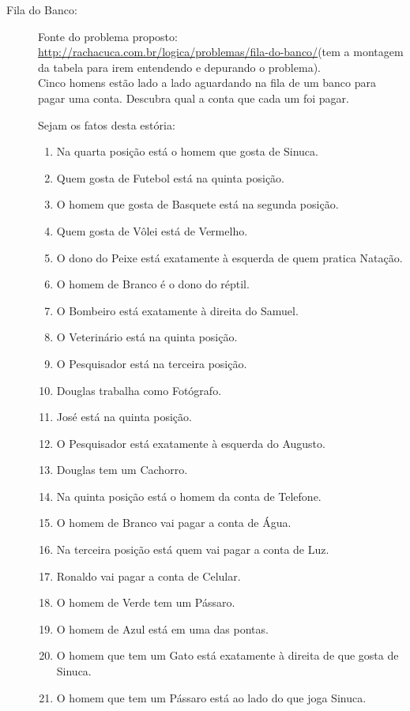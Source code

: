 \documentclass[a4paper,12pt]{article}
\begin{document}
\begin{description}

\newpage
\item [Fila do Banco:] Fonte do problema proposto:   \url{http://rachacuca.com.br/logica/problemas/fila-do-banco/}(tem a montagem da tabela para irem entendendo e depurando o problema).\\
Cinco homens estão lado a lado aguardando na fila de um banco para pagar uma conta. Descubra qual a conta que cada um foi pagar.


Sejam os fatos desta estória:
\begin{enumerate}
   
  \item   Na quarta posição está o homem que gosta de Sinuca.
  \item Quem gosta de Futebol está na quinta posição.
  \item O homem que gosta de Basquete está na segunda posição.
  \item Quem gosta de Vôlei está de Vermelho.
  \item O dono do Peixe está exatamente à esquerda de quem pratica Natação.
  \item O homem de Branco é o dono do réptil.
  \item O Bombeiro está exatamente à direita do Samuel.
  \item O Veterinário está na quinta posição.
  \item O Pesquisador está na terceira posição.
  \item Douglas trabalha como Fotógrafo.
  \item José está na quinta posição.
    \item  O Pesquisador está exatamente à esquerda do Augusto.
    \item  Douglas tem um Cachorro.
    \item  Na quinta posição está o homem da conta de Telefone.
    \item  O homem de Branco vai pagar a conta de Água.
    \item  Na terceira posição está quem vai pagar a conta de Luz.
    \item  Ronaldo vai pagar a conta de Celular.
    \item  O homem de Verde tem um Pássaro.
    \item  O homem de Azul está em uma das pontas.
    \item  O homem que tem um Gato está exatamente à direita de que gosta de Sinuca.
    \item  O homem que tem um Pássaro está ao lado do que joga Sinuca.
   

\end{enumerate}
\end{description}
\end{document}

